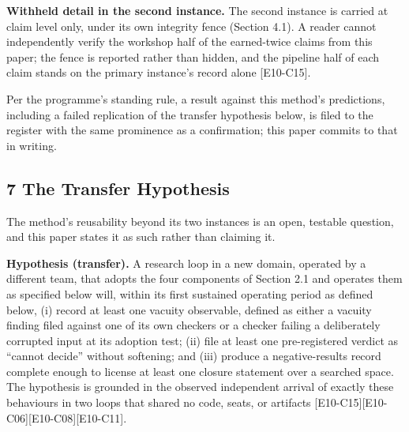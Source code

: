 \documentclass[
  11pt,
]{article}
\begin{document}
\textbf{Withheld detail in the second instance.} The second instance is
carried at claim level only, under its own integrity fence (Section
4.1). A reader cannot independently verify the workshop half of the
earned-twice claims from this paper; the fence is reported rather than
hidden, and the pipeline half of each claim stands on the primary
instance's record alone {[}E10-C15{]}.

Per the programme's standing rule, a result against this method's
predictions, including a failed replication of the transfer hypothesis
below, is filed to the register with the same prominence as a
confirmation; this paper commits to that in writing.

\subsection{7 The Transfer Hypothesis}\label{the-transfer-hypothesis}

The method's reusability beyond its two instances is an open, testable
question, and this paper states it as such rather than claiming it.

\textbf{Hypothesis (transfer).} A research loop in a new domain,
operated by a different team, that adopts the four components of Section
2.1 and operates them as specified below will, within its first
sustained operating period as defined below, (i) record at least one
vacuity observable, defined as either a vacuity finding filed against
one of its own checkers or a checker failing a deliberately corrupted
input at its adoption test; (ii) file at least one pre-registered
verdict as ``cannot decide'' without softening; and (iii) produce a
negative-results record complete enough to license at least one closure
statement over a searched space. The hypothesis is grounded in the
observed independent arrival of exactly these behaviours in two loops
that shared no code, seats, or artifacts
{[}E10-C15{]}{[}E10-C06{]}{[}E10-C08{]}{[}E10-C11{]}.
\end{document}
